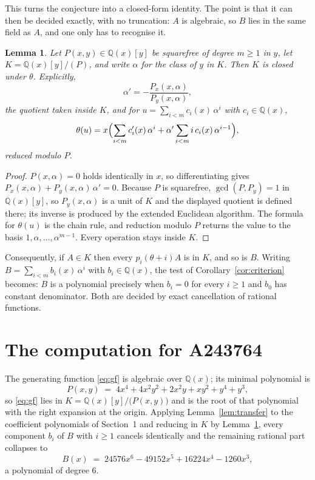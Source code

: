 \documentclass[11pt,a4paper]{article}
\theoremstyle{plain}
\newtheorem{lemma}[theorem]{Lemma}
\theoremstyle{definition}
\begin{document}
This turns the conjecture into a closed-form identity. The point is that it can then be
decided exactly, with no truncation: $A$ is algebraic, so $B$ lies in the same field as
$A$, and one only has to recognise it.

\begin{lemma}\label{lem:field}
Let $P(x,y)\in\mathbb{Q}(x)[y]$ be squarefree of degree $m\ge1$ in $y$, let
$K=\mathbb{Q}(x)[y]/(P)$, and write $\alpha$ for the class of $y$ in $K$. Then $K$ is
closed under $\theta$. Explicitly,
\[
\alpha'=-\frac{P_{x}(x,\alpha)}{P_{y}(x,\alpha)},
\]
the quotient taken inside $K$, and for $u=\sum_{i<m}c_{i}(x)\,\alpha^{i}$ with
$c_{i}\in\mathbb{Q}(x)$,
\[
\theta(u)=x\Bigl(\sum_{i<m}c_{i}'(x)\,\alpha^{i}
 +\alpha'\sum_{i<m}i\,c_{i}(x)\,\alpha^{i-1}\Bigr),
\]
reduced modulo $P$.
\end{lemma}

\begin{proof}
$P(x,\alpha)=0$ holds identically in $x$, so differentiating gives
$P_{x}(x,\alpha)+P_{y}(x,\alpha)\,\alpha'=0$. Because $P$ is squarefree,
$\gcd(P,P_{y})=1$ in $\mathbb{Q}(x)[y]$, so $P_{y}(x,\alpha)$ is a unit of $K$ and the
displayed quotient is defined there; its inverse is produced by the extended Euclidean
algorithm. The formula for $\theta(u)$ is the chain rule, and reduction modulo $P$ returns
the value to the basis $1,\alpha,\dots,\alpha^{m-1}$. Every operation stays inside $K$.
\end{proof}

Consequently, if $A\in K$ then every $p_{i}(\theta+i)A$ is in $K$, and so is $B$. Writing
$B=\sum_{i<m}b_{i}(x)\,\alpha^{i}$ with $b_{i}\in\mathbb{Q}(x)$, the test of
Corollary~\ref{cor:criterion} becomes: $B$ is a polynomial precisely when $b_{i}=0$ for
every $i\ge1$ and $b_{0}$ has constant denominator. Both are decided by exact
cancellation of rational functions.

\section{The computation for A243764}

The generating function \eqref{eq:gf} is algebraic over $\mathbb{Q}(x)$;
its minimal polynomial is
\[
P(x,y) \;=\; 4 x^{4} + 4 x^{2} y^{2} + 2 x^{2} y + x y^{2} + y^{4} + y^{3} ,
\]
so \eqref{eq:gf} lies in $K=\mathbb{Q}(x)[y]/\bigl(P(x,y)\bigr)$ and is the root of that polynomial with the right
expansion at the origin. Applying Lemma~\ref{lem:transfer} to the coefficient polynomials
of Section~1 and reducing in $K$ by Lemma~\ref{lem:field}, every component $b_{i}$ of $B$
with $i\ge1$ cancels identically and the remaining rational part collapses to
\[
B(x)\;=\;24576 x^{6} - 49152 x^{5} + 16224 x^{4} - 1260 x^{3} ,
\]
a polynomial of degree $6$.
\end{document}
